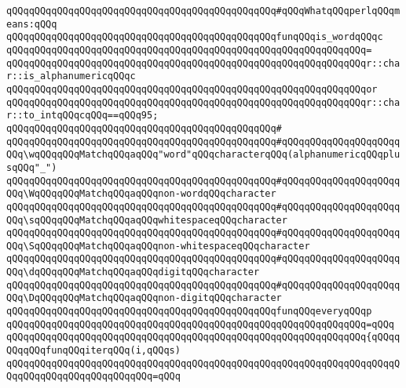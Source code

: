\newline
\verb|qQQqqQQqqQQqqQQqqQQqqQQqqQQqqQQqqQQqqQQqqQQqqQQq#qQQqWhatqQQqperlqQQqmeans:qQQq|\newline
\newline
\verb|qQQqqQQqqQQqqQQqqQQqqQQqqQQqqQQqqQQqqQQqqQQqqQQqfunqQQqis_wordqQQqc|\newline
\verb|qQQqqQQqqQQqqQQqqQQqqQQqqQQqqQQqqQQqqQQqqQQqqQQqqQQqqQQqqQQqqQQq=|\newline
\verb|qQQqqQQqqQQqqQQqqQQqqQQqqQQqqQQqqQQqqQQqqQQqqQQqqQQqqQQqqQQqqQQqr::char::is_alphanumericqQQqc|\newline
\verb|qQQqqQQqqQQqqQQqqQQqqQQqqQQqqQQqqQQqqQQqqQQqqQQqqQQqqQQqqQQqqQQqor|\newline
\verb|qQQqqQQqqQQqqQQqqQQqqQQqqQQqqQQqqQQqqQQqqQQqqQQqqQQqqQQqqQQqqQQqr::char::to_intqQQqcqQQq==qQQq95;|\newline
\newline
\verb|qQQqqQQqqQQqqQQqqQQqqQQqqQQqqQQqqQQqqQQqqQQqqQQq#|\newline
\verb|qQQqqQQqqQQqqQQqqQQqqQQqqQQqqQQqqQQqqQQqqQQqqQQq#qQQqqQQqqQQqqQQqqQQqqQQq\wqQQqqQQqMatchqQQqaqQQq"word"qQQqcharacterqQQq(alphanumericqQQqplusqQQq"_")|\newline
\verb|qQQqqQQqqQQqqQQqqQQqqQQqqQQqqQQqqQQqqQQqqQQqqQQq#qQQqqQQqqQQqqQQqqQQqqQQq\WqQQqqQQqMatchqQQqaqQQqnon-wordqQQqcharacter|\newline
\verb|qQQqqQQqqQQqqQQqqQQqqQQqqQQqqQQqqQQqqQQqqQQqqQQq#qQQqqQQqqQQqqQQqqQQqqQQq\sqQQqqQQqMatchqQQqaqQQqwhitespaceqQQqcharacter|\newline
\verb|qQQqqQQqqQQqqQQqqQQqqQQqqQQqqQQqqQQqqQQqqQQqqQQq#qQQqqQQqqQQqqQQqqQQqqQQq\SqQQqqQQqMatchqQQqaqQQqnon-whitespaceqQQqcharacter|\newline
\verb|qQQqqQQqqQQqqQQqqQQqqQQqqQQqqQQqqQQqqQQqqQQqqQQq#qQQqqQQqqQQqqQQqqQQqqQQq\dqQQqqQQqMatchqQQqaqQQqdigitqQQqcharacter|\newline
\verb|qQQqqQQqqQQqqQQqqQQqqQQqqQQqqQQqqQQqqQQqqQQqqQQq#qQQqqQQqqQQqqQQqqQQqqQQq\DqQQqqQQqMatchqQQqaqQQqnon-digitqQQqcharacter|\newline
\newline
\verb|qQQqqQQqqQQqqQQqqQQqqQQqqQQqqQQqqQQqqQQqqQQqqQQqfunqQQqeveryqQQqp|\newline
\verb|qQQqqQQqqQQqqQQqqQQqqQQqqQQqqQQqqQQqqQQqqQQqqQQqqQQqqQQqqQQqqQQq=qQQq|\newline
\verb|qQQqqQQqqQQqqQQqqQQqqQQqqQQqqQQqqQQqqQQqqQQqqQQqqQQqqQQqqQQqqQQq{qQQqqQQqqQQqfunqQQqiterqQQq(i,qQQqs)|\newline
\verb|qQQqqQQqqQQqqQQqqQQqqQQqqQQqqQQqqQQqqQQqqQQqqQQqqQQqqQQqqQQqqQQqqQQqqQQqqQQqqQQqqQQqqQQqqQQqqQQq=qQQq|\newline
